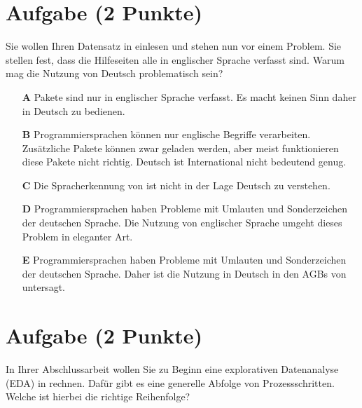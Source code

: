 \documentclass[a4paper, 9pt]{scrartcl}\usepackage[]{graphicx}\usepackage[]{xcolor}
\begin{document}
\section{Aufgabe \hfill (2 Punkte)}



Sie wollen Ihren Datensatz in \Rlogo einlesen und stehen nun vor einem Problem. Sie stellen fest, dass die Hilfeseiten alle in englischer Sprache verfasst sind. Warum mag die Nutzung von Deutsch problematisch sein?



\begin{enumerate}
\item [\textbf{A} \msquare] \Rlogo Pakete sind nur in englischer Sprache verfasst. Es macht keinen Sinn \Rlogo daher in Deutsch zu bedienen.
\item [\textbf{B} \msquare] Programmiersprachen können nur englische Begriffe verarbeiten. Zusätzliche Pakete können zwar geladen werden, aber meist funktionieren diese Pakete nicht richtig. Deutsch ist International nicht bedeutend genug.
\item [\textbf{C} \msquare] Die Spracherkennung von \Rlogo ist nicht in der Lage Deutsch zu verstehen.
\item [\textbf{D} \msquare] Programmiersprachen haben Probleme mit Umlauten und Sonderzeichen der deutschen Sprache. Die Nutzung von englischer Sprache umgeht dieses Problem in eleganter Art.
\item [\textbf{E} \msquare] Programmiersprachen haben Probleme mit Umlauten und Sonderzeichen der deutschen Sprache. Daher ist die Nutzung in Deutsch in den AGBs von \Rlogo untersagt.
\end{enumerate}

\section{Aufgabe \hfill (2 Punkte)}



In Ihrer Abschlussarbeit wollen Sie zu Beginn eine explorativen Datenanalyse (EDA) in \Rlogo rechnen. Dafür gibt es eine generelle Abfolge von Prozessschritten. Welche ist hierbei die richtige Reihenfolge?
\end{document}
